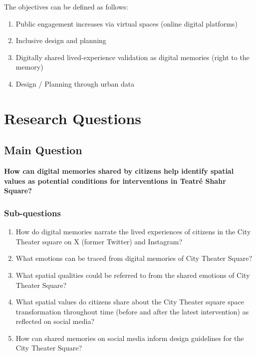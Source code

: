 \documentclass[
  letterpaper,
  DIV=11,
  numbers=noendperiod]{scrartcl}
\providecommand{\tightlist}{%
  \setlength{\itemsep}{0pt}\setlength{\parskip}{0pt}}
\begin{document}
The objectives can be defined as follows:

\begin{enumerate}
\def\labelenumi{\arabic{enumi}.}
\tightlist
\item
  Public engagement increases via virtual spaces (online digital
  platforms)
\item
  Inclusive design and planning
\item
  Digitally shared lived-experience validation as digital memories
  (right to the memory)
\item
  Design / Planning through urban data
\end{enumerate}

\section{Research Questions}\label{research-questions}

\subsection{Main Question}\label{main-question}

\textbf{How can digital memories shared by citizens help identify
spatial values as potential conditions for interventions in Teatré Shahr
Square?}

\subsubsection{Sub-questions}\label{sub-questions}

\begin{enumerate}
\def\labelenumi{\arabic{enumi}.}
\item
  How do digital memories narrate the lived experiences of citizens in
  the City Theater square on X (former Twitter) and Instagram?
\item
  What emotions can be traced from digital memories of City Theater
  Square?
\item
  What spatial qualities could be referred to from the shared emotions
  of City Theater Square?
\item
  What spatial values do citizens share about the City Theater square
  space transformation throughout time (before and after the latest
  intervention) as reflected on social media?
\item
  How can shared memories on social media inform design guidelines for
  the City Theater Square?
\end{enumerate}
\end{document}
